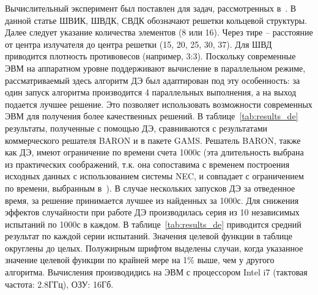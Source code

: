 \documentclass{llncs}
\begin{document}
Вычислительный эксперимент был поставлен для задач, рассмотренных в~\cite{tyunin:daor,tyunin:oniip}. В данной статье ШВИК, ШВДК, СВДК обозначают решетки кольцевой структуры. Далее следует указание количества элементов (8 или 16). Через тире -- расстояние от центра излучателя до центра решетки (15, 20, 25, 30, 37). Для ШВД приводится плотность противовесов (например, 3:3). Поскольку современные ЭВМ на аппаратном уровне поддерживают вычисление в параллельном режиме, рассматриваемый здесь алгоритм ДЭ был адаптирован под эту особенность: за один запуск алгоритма производится 4 параллельных выполнения, а на выход подается лучшее решение. Это позволяет использовать возможности современных ЭВМ для получения более качественных решений. В таблице~\ref{tab:results_de} результаты, полученные с помощью ДЭ, сравниваются с результатами коммерческого решателя BARON и в пакете GAMS. 
Решатель BARON, также как ДЭ, имеют ограничение по времени счета 1000с (эта длительность выбрана из практических соображений, т.к. она сопоставима с временем построения исходных данных с использованием системы NEC, и совпадает с ограничением по времени, выбранным в~\cite{tyunin:daor}). 
В случае нескольких запусков ДЭ за отведенное время, за решение принимается лучшее из найденных за 1000с. Для снижения эффектов случайности при работе ДЭ производилась серия из 10 независимых испытаний по 1000с в каждом. В таблице~\ref{tab:results_de} приводится средний результат по каждой серии испытаний. Значения целевой функции в таблице округлены до целых. Полужирным шрифтом выделены случаи, когда указанное значение целевой функции по крайней мере на 1\% выше, чем у другого алгоритма. Вычисления производидись на ЭВМ с процессором Intel i7 (тактовая частота:
2.8ГГц), ОЗУ: 16Гб. 
\end{document}
